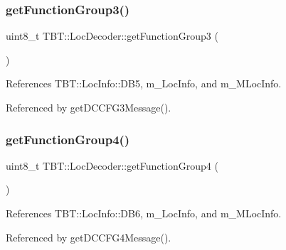 \subsubsection{\texorpdfstring{get\+Function\+Group3()}{getFunctionGroup3()}}
{\footnotesize\ttfamily uint8\+\_\+t T\+B\+T\+::\+Loc\+Decoder\+::get\+Function\+Group3 (\begin{DoxyParamCaption}{ }\end{DoxyParamCaption})\hspace{0.3cm}{\ttfamily [inline]}}



References T\+B\+T\+::\+Loc\+Info\+::\+D\+B5, m\+\_\+\+Loc\+Info, and m\+\_\+\+M\+Loc\+Info.



Referenced by get\+D\+C\+C\+F\+G3\+Message().

\mbox{\label{classTBT_1_1LocDecoder_ab3f960f23613062dd97a3fb2274ee02c_ab3f960f23613062dd97a3fb2274ee02c}} 
\subsubsection{\texorpdfstring{get\+Function\+Group4()}{getFunctionGroup4()}}
{\footnotesize\ttfamily uint8\+\_\+t T\+B\+T\+::\+Loc\+Decoder\+::get\+Function\+Group4 (\begin{DoxyParamCaption}{ }\end{DoxyParamCaption})\hspace{0.3cm}{\ttfamily [inline]}}



References T\+B\+T\+::\+Loc\+Info\+::\+D\+B6, m\+\_\+\+Loc\+Info, and m\+\_\+\+M\+Loc\+Info.



Referenced by get\+D\+C\+C\+F\+G4\+Message().

\mbox{\label{classTBT_1_1LocDecoder_aac83243e509961ce7eedb9959fcecb73_aac83243e509961ce7eedb9959fcecb73}} 
